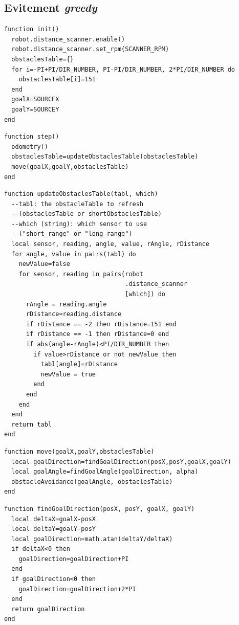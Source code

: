 \begin{subappendices}
  \subsection{Evitement \emph{greedy}\label{app:implEvitGreedy}}
  \begin{lstlisting}[caption=Initialisation]
function init()
  robot.distance_scanner.enable()
  robot.distance_scanner.set_rpm(SCANNER_RPM)
  obstaclesTable={}
  for i=-PI+PI/DIR_NUMBER, PI-PI/DIR_NUMBER, 2*PI/DIR_NUMBER do
    obstaclesTable[i]=151
  end
  goalX=SOURCEX
  goalY=SOURCEY
end
  \end{lstlisting}
  \begin{lstlisting}[caption=Structure générale]
function step()
  odometry()
  obstaclesTable=updateObstaclesTable(obstaclesTable)
  move(goalX,goalY,obstaclesTable)
end
  \end{lstlisting}
  \begin{lstlisting}[caption=Rafraîchir la table des mesures à chaque pas, label=lst:updateObstaclesTable]
function updateObstaclesTable(tabl, which) 
  --tabl: the obstacleTable to refresh
  --(obstaclesTable or shortObstaclesTable)
  --which (string): which sensor to use
  --("short_range" or "long_range")
  local sensor, reading, angle, value, rAngle, rDistance
  for angle, value in pairs(tabl) do
    newValue=false
    for sensor, reading in pairs(robot
                                 .distance_scanner
                                 [which]) do
      rAngle = reading.angle
      rDistance=reading.distance
      if rDistance == -2 then rDistance=151 end
      if rDistance == -1 then rDistance=0 end
      if abs(angle-rAngle)<PI/DIR_NUMBER then
        if value>rDistance or not newValue then
          tabl[angle]=rDistance
          newValue = true
        end
      end
    end
  end
  return tabl
end
  \end{lstlisting}
  \begin{lstlisting}[caption=Fonction move]
function move(goalX,goalY,obstaclesTable)
  local goalDirection=findGoalDirection(posX,posY,goalX,goalY)
  local goalAngle=findGoalAngle(goalDirection, alpha)
  obstacleAvoidance(goalAngle, obstaclesTable)
end
  \end{lstlisting}
  \begin{lstlisting}[caption=Trouver la direction du goal vu du footbot]
function findGoalDirection(posX, posY, goalX, goalY)
  local deltaX=goalX-posX
  local deltaY=goalY-posY
  local goalDirection=math.atan(deltaY/deltaX)
  if deltaX<0 then
    goalDirection=goalDirection+PI
  end
  if goalDirection<0 then
    goalDirection=goalDirection+2*PI
  end
  return goalDirection
end


\end{lstlisting}
\end{subappendices}
